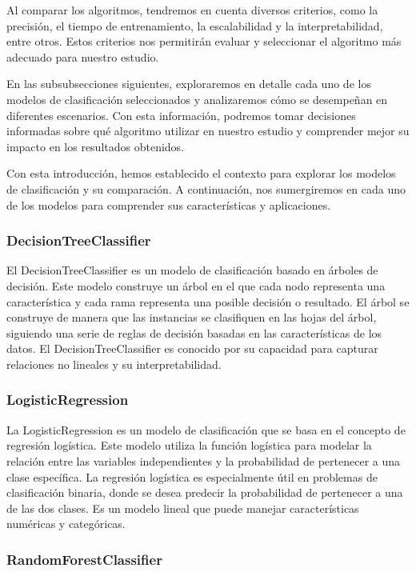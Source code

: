 Al comparar los algoritmos, tendremos en cuenta diversos criterios, como la precisión, el tiempo de entrenamiento, la escalabilidad y la interpretabilidad, entre otros. Estos criterios nos permitirán evaluar y seleccionar el algoritmo más adecuado para nuestro estudio.

En las subsubsecciones siguientes, exploraremos en detalle cada uno de los modelos de clasificación seleccionados y analizaremos cómo se desempeñan en diferentes escenarios. Con esta información, podremos tomar decisiones informadas sobre qué algoritmo utilizar en nuestro estudio y comprender mejor su impacto en los resultados obtenidos.

Con esta introducción, hemos establecido el contexto para explorar los modelos de clasificación y su comparación. A continuación, nos sumergiremos en cada uno de los modelos para comprender sus características y aplicaciones.

\subsubsection{DecisionTreeClassifier}

El DecisionTreeClassifier es un modelo de clasificación basado en árboles de decisión. Este modelo construye un árbol en el que cada nodo representa una característica y cada rama representa una posible decisión o resultado. El árbol se construye de manera que las instancias se clasifiquen en las hojas del árbol, siguiendo una serie de reglas de decisión basadas en las características de los datos. El DecisionTreeClassifier es conocido por su capacidad para capturar relaciones no lineales y su interpretabilidad.

\subsubsection{LogisticRegression}

La LogisticRegression es un modelo de clasificación que se basa en el concepto de regresión logística. Este modelo utiliza la función logística para modelar la relación entre las variables independientes y la probabilidad de pertenecer a una clase específica. La regresión logística es especialmente útil en problemas de clasificación binaria, donde se desea predecir la probabilidad de pertenecer a una de las dos clases. Es un modelo lineal que puede manejar características numéricas y categóricas.

\subsubsection{RandomForestClassifier}

